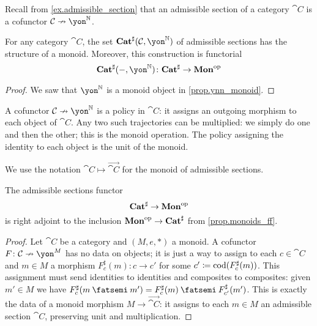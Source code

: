 \documentclass[Book-Poly]{subfiles}
\begin{document}
Recall from \cref{ex.admissible_section} that an admissible section of a category $\cat{C}$ is a cofunctor $\cat{C}\cof\yon^\nn$.

\begin{corollary}
For any category $\cat{C}$, the set $\smcat^\sharp(\cat{C},\yon^\nn)$ of admissible sections has the structure of a monoid. Moreover, this construction is functorial
\[\smcat^\sharp(-,\yon^\nn)\colon\smcat^\sharp\to\Cat{Mon}\op\]
\end{corollary}
\begin{proof}
We saw that $\yon^\nn$ is a monoid object in \cref{prop.ynn_monoid}.
\end{proof}

A cofunctor $\cat{C}\cof\yon^\nn$ is a policy in $\cat{C}$: it assigns an outgoing morphism to each object of $\cat{C}$. Any two such trajectories can be multiplied: we simply do one and then the other; this is the monoid operation. The policy assigning the identity to each object is the unit of the monoid.

We use the notation $\cat{C}\mapsto\vec{\cat{C}}$ for the monoid of admissible sections.

\begin{theorem}\label{thm.catsharp_to_mon}
The admissible sections functor
\[\mathbf{Cat}^\sharp\to\mathbf{Mon}^{\textnormal{op}}\]
is right adjoint to the inclusion $\mathbf{Mon}^{\textnormal{op}}\to\mathbf{Cat}^\sharp$ from \cref{prop.monoids_ff}.
\end{theorem}
\begin{proof}
Let $\cat{C}$ be a category and $(M,e,*)$ a monoid. A cofunctor $F\colon\cat{C}\cof\yon^M$ has no data on objects; it is just a way to assign to each $c\in \cat{C}$ and $m\in M$ a morphism $F^\sharp_c(m)\colon c\to c'$ for some $c'\coloneqq\operatorname{cod}(F^\sharp_c(m))$. This assignment must send identities to identities and composites to composites: given $m'\in M$ we have $F^\sharp_c(m\then m')=F^\sharp_c(m)\then F^\sharp_{c'}(m')$. This is exactly the data of a monoid morphism $M\to \vec{\cat{C}}$: it assigns to each $m\in M$ an admissible section $\cat{C}$, preserving unit and multiplication.
\end{proof}
\end{document}
